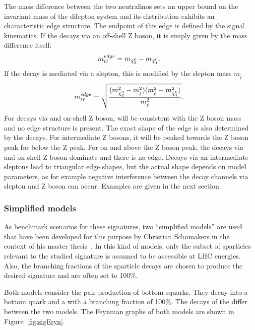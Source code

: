 The mass difference between the two neutralinos sets an upper bound on the invariant mass of the dilepton system \mll and its distribution exhibits an characteristic edge structure. The endpoint of this edge is defined by the signal kinematics.  If the \secondchi decays via an off-shell Z boson, it is simply given by the mass difference itself:
\begin{equation}
m_{\ell\ell}^{edge} = m_{{\tilde{\chi}^0_2}} - m_{{\tilde{\chi}^0_1}}.
\end{equation}
If the decay is mediated via a slepton, this is modified by the slepton mass $m_{\tilde{\ell}}$
\begin{equation}
m_{\ell\ell}^{edge} = \sqrt{\frac{(m_{{\tilde{\chi}^0_2}}^2-m_{\tilde{\ell}}^2)(m_{\tilde{\ell}}^2-m_{{\tilde{\chi}^0_1}}^2)}{m_{\tilde{\ell}}^2}}. 
\end{equation}
For decays via and on-shell Z boson, \mll will be consistent with the Z boson mass and no edge structure is present. The exact shape of the edge is also determined by the decays. For intermediate Z bosons, it will be peaked towards the Z boson peak for \mlledge below the Z peak. For \mlledge on and above the Z boson peak, the decays via and on-shell Z boson dominate and there is no edge. Decays via an intermediate sleptons lead to triangular edge shapes, but the actual shape depends on model parameters, as for example negative interference between the decay channels via slepton and Z boson can occur. Examples are given in the next section.
\subsubsection{Simplified models}
\label{sec:models}
As benchmark scenarios for these signatures, two ``simplified models'' are used that have been developed for this purpose by Christian Schomakers in the context of his master thesis~\cite{Schomakers:2014zza}. In this kind of models, only the subset of sparticles relevant to the studied signature is assumed to be accessible at LHC energies. Also, the branching fractions of the sparticle decays are chosen to produce the desired signature and are often set to 100\%.  

Both models consider the pair production of bottom squarks. They decay into a bottom quark and a \secondchi with a branching fraction of 100\%. The decays of the \secondchi differ between the two models. The Feynman graphs of both models are shown in Figure~\ref{fig:sigFeyn}.

